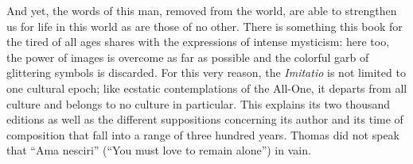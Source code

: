 And yet, the words of this man, removed from the world, are able to
strengthen us for life in this world as are those of no other. There is
something this book for the tired of all ages shares with the
expressions of intense mysticism: here too, the power of images is
overcome as far as possible and the colorful garb of glittering symbols
is discarded. For this
\protect\hypertarget{17_Chapter_Ten__THE_FAILURE_OF_IMAG.xhtmlux5cux23page_267}{}{}very
reason, the \emph{Imitatio} is not limited to one cultural epoch; like
ecstatic contemplations of the All-One, it departs from all culture and
belongs to no culture in particular. This explains its two thousand
editions as well as the different suppositions concerning its author and
its time of composition that fall into a range of three hundred years.
Thomas did not speak that ``Ama nesciri'' (``You must love to remain
alone'') in vain.
